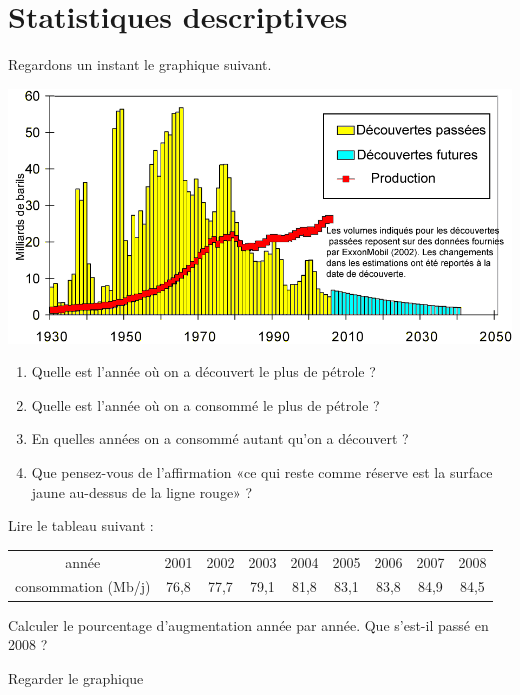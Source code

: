 
\chapter{Statistiques descriptives}

Regardons un instant le graphique suivant.

\includegraphics[width=17cm]{Decouvertes-petrole.png}

\begin{enumerate}
    \item
        Quelle est l'année où on a découvert le plus de pétrole ?
    \item
        Quelle est l'année où on a consommé le plus de pétrole ?
    \item
        En quelles années on a consommé autant qu'on a découvert ?
    \item
        Que pensez-vous de l'affirmation «ce qui reste comme réserve est la surface jaune au-dessus de la ligne rouge» ?
\end{enumerate}

Lire le tableau suivant :
\begin{center}
\begin{tabular}[h]{|c|c|c|c|c|c|c|c|c|}
année&
2001&
2002&
2003&
2004&
2005&
2006&
2007&
2008\\
consommation (Mb/j)&
76,8&
77,7&
79,1&
81,8&
83,1&
83,8&
84,9&
84,5
\end{tabular}
\end{center}

Calculer le pourcentage d'augmentation année par année. Que s'est-il passé en 2008 ?

Regarder le graphique


